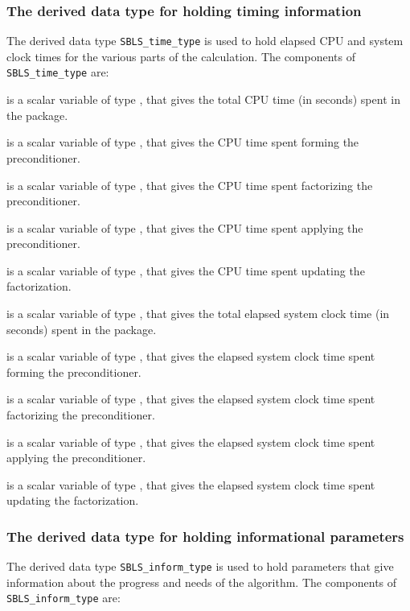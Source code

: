 \documentclass{galahad}
\newcommand{\packagename}{SBLS}
\begin{document}
\subsubsection{The derived data type for holding timing
 information}\label{typetime}
The derived data type
{\tt \packagename\_time\_type}
is used to hold elapsed CPU and system clock times for the various parts
of the calculation. The components of
{\tt \packagename\_time\_type}
are:
\begin{description}
 is a scalar variable of type \realdp, that gives
 the total CPU time (in seconds) spent in the package.

 is a scalar variable of type \realdp, that gives
 the CPU time spent forming the preconditioner.

 is a scalar variable of type \realdp, that gives
 the CPU time spent factorizing the preconditioner.

 is a scalar variable of type \realdp, that gives
 the CPU time spent applying the preconditioner.

 is a scalar variable of type \realdp, that gives
 the CPU time spent updating the factorization.

 is a scalar variable of type \realdp, that gives
 the total elapsed system clock time (in seconds) spent in the package.

 is a scalar variable of type \realdp, that gives
 the  elapsed system clock time spent forming the preconditioner.

 is a scalar variable of type \realdp, that gives
 the elapsed system clock time spent factorizing the preconditioner.

 is a scalar variable of type \realdp, that gives
 the elapsed system clock time spent applying the preconditioner.

 is a scalar variable of type \realdp, that gives
 the elapsed system clock time spent updating the factorization.

\end{description}


\subsubsection{The derived data type for holding informational
 parameters}\label{typeinform}
The derived data type
{\tt \packagename\_inform\_type}
is used to hold parameters that give information about the progress and needs
of the algorithm. The components of
{\tt \packagename\_inform\_type}
are:
\end{document}
